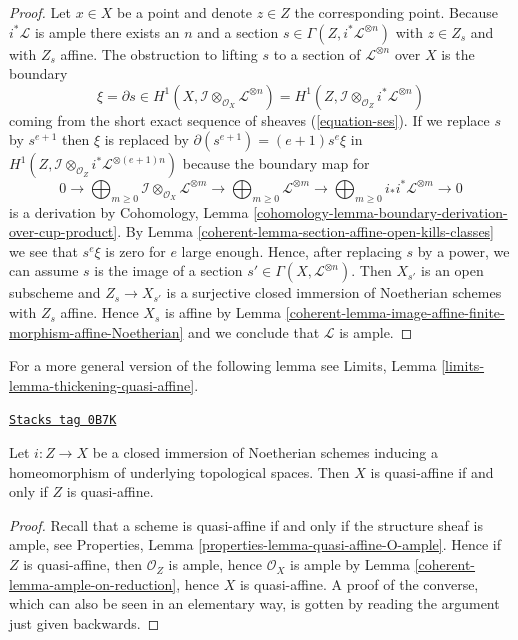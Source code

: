 \begin{proof}
\medskip\noindent
Let $x \in X$ be a point and denote $z \in Z$ the corresponding point.
Because $i^*\mathcal{L}$ is ample there exists an $n$ and a section
$s \in \Gamma(Z, i^*\mathcal{L}^{\otimes n})$ with $z \in Z_s$
and with $Z_s$ affine. The obstruction to lifting $s$ to a section
of $\mathcal{L}^{\otimes n}$ over $X$ is the boundary
$$
\xi = \partial s \in
H^1(X, \mathcal{I} \otimes_{\mathcal{O}_X} \mathcal{L}^{\otimes n}) =
H^1(Z, \mathcal{I} \otimes_{\mathcal{O}_Z} i^*\mathcal{L}^{\otimes n})
$$
coming from the short exact sequence of sheaves (\ref{equation-ses}).
If we replace $s$ by $s^{e + 1}$ then $\xi$ is replaced by
$\partial(s^{e + 1}) = (e + 1) s^e \xi$ in
$H^1(Z, \mathcal{I} \otimes_{\mathcal{O}_Z} i^*\mathcal{L}^{\otimes (e + 1)n})$
because the boundary map for
$$
0 \to
\bigoplus\nolimits_{m \geq 0}
\mathcal{I} \otimes_{\mathcal{O}_X} \mathcal{L}^{\otimes m} \to
\bigoplus\nolimits_{m \geq 0}
\mathcal{L}^{\otimes m} \to
\bigoplus\nolimits_{m \geq 0}
i_*i^*\mathcal{L}^{\otimes m} \to 0
$$
is a derivation by Cohomology, Lemma
\ref{cohomology-lemma-boundary-derivation-over-cup-product}. By
Lemma \ref{coherent-lemma-section-affine-open-kills-classes}
we see that $s^e \xi$ is zero for $e$ large enough.
Hence, after replacing $s$ by a power, we can assume $s$ is the image
of a section $s' \in \Gamma(X, \mathcal{L}^{\otimes n})$.
Then $X_{s'}$ is an open subscheme and $Z_s \to X_{s'}$ is a surjective
closed immersion of Noetherian schemes with $Z_s$ affine. Hence
$X_s$ is affine by
Lemma \ref{coherent-lemma-image-affine-finite-morphism-affine-Noetherian} and
we conclude that $\mathcal{L}$ is ample.
\end{proof}

For a more general version of the following lemma see
Limits, Lemma \ref{limits-lemma-thickening-quasi-affine}.

\begin{lemma}
\label{coherent-lemma-thickening-quasi-affine}
\href{https://stacks.math.columbia.edu/tag/0B7K}{\texttt{Stacks tag 0B7K}}

Let $i : Z \to X$ be a closed immersion of Noetherian schemes
inducing a homeomorphism of underlying topological spaces.
Then $X$ is quasi-affine if and only if $Z$ is quasi-affine.
\end{lemma}

\begin{proof}

Recall that a scheme is quasi-affine
if and only if the structure sheaf is ample, see
Properties, Lemma \ref{properties-lemma-quasi-affine-O-ample}.
Hence if $Z$ is quasi-affine, then $\mathcal{O}_Z$ is ample,
hence $\mathcal{O}_X$ is ample by
Lemma \ref{coherent-lemma-ample-on-reduction}, hence
$X$ is quasi-affine. A proof of the converse, which
can also be seen in an elementary way, is gotten by
reading the argument just given backwards.
\end{proof}

